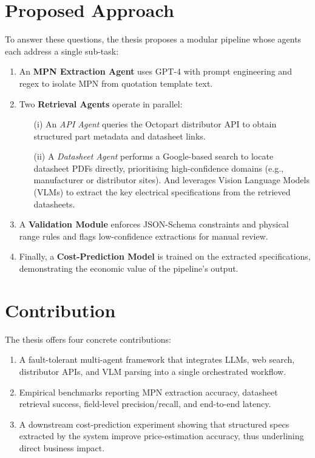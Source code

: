 \section{Proposed Approach }
To answer these questions, the thesis proposes a modular pipeline whose agents each address a single sub-task:  
\begin{enumerate}
  \item An \textbf{MPN Extraction Agent} uses GPT-4 with prompt engineering and regex to isolate MPN from quotation template text.  
  \item Two \textbf{Retrieval Agents} operate in parallel:
    \begin{itemize}
      \item[(i)] An \emph{API Agent} queries the Octopart distributor API to obtain structured part metadata and datasheet links.
      \item[(ii)] A \emph{Datasheet Agent} performs a Google-based search to locate datasheet PDFs directly, prioritising high-confidence domains (e.g., manufacturer or distributor sites). And leverages Vision Language Models (VLMs) to extract the key electrical specifications from the retrieved datasheets.
    \end{itemize}
  \item A \textbf{Validation Module} enforces JSON-Schema constraints and physical range rules and flags low-confidence extractions for manual review.  
  \item Finally, a \textbf{Cost-Prediction Model} is trained on the extracted specifications, demonstrating the economic value of the pipeline's output.
\end{enumerate}

\section{Contribution }
The thesis offers four concrete contributions:
\begin{enumerate}
  \item A fault-tolerant multi-agent framework that integrates LLMs, web search, distributor APIs, and VLM parsing into a single orchestrated workflow.  
  \item Empirical benchmarks reporting MPN extraction accuracy, datasheet retrieval success, field-level precision/recall, and end-to-end latency.  
  \item A downstream cost-prediction experiment showing that structured specs extracted by the system improve price-estimation accuracy, thus underlining direct business impact.
\end{enumerate}

